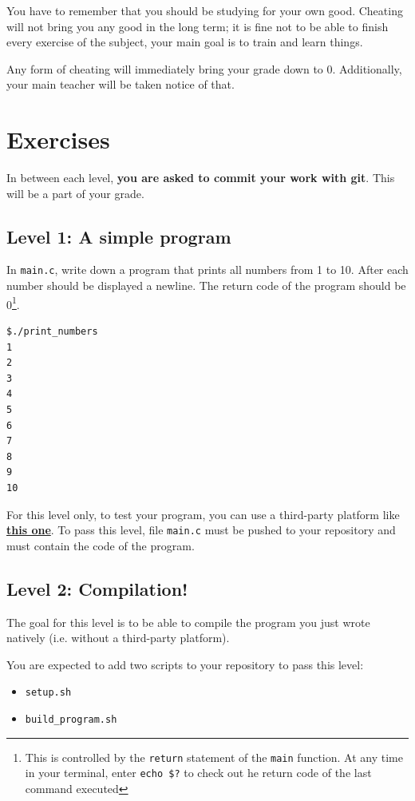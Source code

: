 \documentclass[12pt]{article}
\let\oldhref\href
\renewcommand{\href}[2]{\oldhref{#1}{\bfseries#2}}
\begin{document}
You have to remember that you should be studying for your own good. Cheating will not bring you any good in the long term; it is fine not to be able to finish every exercise of the subject, your main goal is to train and learn things.

Any form of cheating will immediately bring your grade down to 0. Additionally, your main teacher will be taken notice of that.

\section{Exercises}

In between each level, \textbf{you are asked to commit your work with git}. This will be a part of your grade.

\subsection{Level 1: A simple program}

In \texttt{main.c}, write down a program that prints all numbers from 1 to 10. After each number should be displayed a newline.
The return code of the program should be 0\footnote{This is controlled by the \texttt{return} statement of the \texttt{main} function. At any time in your terminal, enter \texttt{echo \$?} to check out he return code of the last command executed}.

\begin{lstlisting}[language=bash]
$./print_numbers
1
2
3
4
5
6
7
8
9
10
\end{lstlisting}

For this level only, to test your program, you can use a third-party platform like \href{https://www.onlinegdb.com/online\_c\_compiler}{this one}. To pass this level, file \texttt{main.c} must be pushed to your repository and must contain the code of the program.

\subsection{Level 2: Compilation!}

The goal for this level is to be able to compile the program you just wrote natively (i.e. without a third-party platform).

You are expected to add two scripts to your repository to pass this level:
\begin{itemize}
	\item \texttt{setup.sh}
	\item \texttt{build\_program.sh}
\end{itemize}
\end{document}
